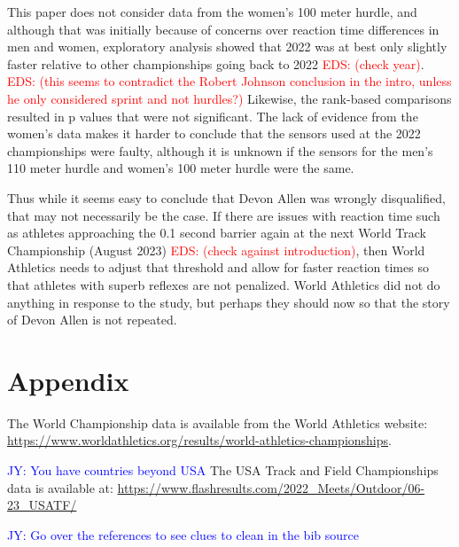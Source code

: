 \documentclass[12pt, letterpaper, titlepage]{article}
\newcommand{\jy}[1]{\textcolor{blue}{JY: #1}}
\newcommand{\eds}[1]{\textcolor{red}{EDS: (#1)}}
\begin{document}
This paper does not consider data from the women's 100 meter hurdle, and although
that was initially because of concerns over reaction time differences in men and
women, exploratory analysis showed that 2022 was at best only
slightly faster relative to other championships going back to 2022 
\eds{check year}. \eds{this seems to contradict the Robert Johnson conclusion in 
the intro, unless he only considered sprint and not hurdles?} Likewise,
the rank-based comparisons resulted in p values that were not significant.  The
lack of evidence from the women's data makes it harder to conclude 
that the sensors used at the 2022 championships were faulty, although it is
unknown if the sensors for the men's 110 meter hurdle and women's 100 meter
hurdle were the same.

Thus while it seems easy
to conclude that Devon Allen was wrongly disqualified, that may not necessarily
be the case. 
If there are issues with reaction time such as athletes approaching 
the 0.1 
second barrier again at the next World Track Championship (August 2023)
\eds{check against introduction}, then World Athletics 
needs to adjust that threshold and allow for faster reaction times so that 
athletes with superb 
reflexes are not penalized. %
World Athletics did not
do anything in response to the \citet{komi2009iaaf} study, but perhaps they 
should now so
that the story of Devon Allen is not repeated.

\section*{Appendix}
\label{sec:Appendix}
The World Championship data is available from the World Athletics website:
\url{https://www.worldathletics.org/results/world-athletics-championships}.

\jy{You have countries beyond USA}
The USA Track and Field Championships data is available at: 
\url{https://www.flashresults.com/2022_Meets/Outdoor/06-23_USATF/}



\jy{Go over the references to see clues to clean in the bib source}


\end{document}
